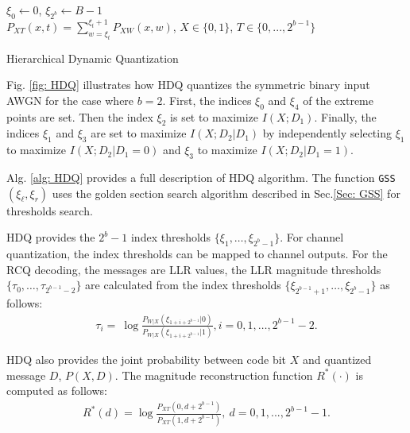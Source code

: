 \documentclass [PhD] {uclathes}
\begin{document}
\begin{algorithm}[t]
    \label{alg: HDQ}
    
    $\xi_0\leftarrow 0$, 
    $\xi_{2^b}\leftarrow B-1$\\
    $P_{XT}(x,t)=\sum_{w=\xi_t}^{\xi_t+1}P_{XW}(x,w)$, $X\in\{0,1\}$, $T\in\{0,...,2^{b-1}\}$
    \caption{Hierarchical Dynamic Quantization }
    \end{algorithm}
Fig. \ref{fig: HDQ} illustrates how HDQ quantizes the symmetric binary input AWGN for the case where $b=2$. First, the indices  $\xi_0$  and $\xi_4$ of the extreme points are set.  Then the index $\xi_2$ is set to maximize $I(X;D_1)$.  Finally, the indices $\xi_1$ and $\xi_3$ are set to maximize $I(X;D_2| D_1)$ by independently selecting $\xi_1$ to maximize $I(X;D_2| D_1=0)$ and $\xi_3$ to maximize $I(X;D_2| D_1=1)$.


Alg. \ref{alg: HDQ} provides a full description of HDQ algorithm. The function \texttt{GSS}$(\xi_{\ell},\xi_r)$ uses the golden section search algorithm described in Sec.\ref{Sec: GSS} for thresholds search.

HDQ provides the $2^b -1$ index thresholds $\{\xi_1, \ldots, \xi_{2^b-1} \}$. For channel quantization, the index thresholds can be mapped to channel outputs. For the RCQ decoding, the messages are LLR values, the LLR magnitude thresholds $\{\tau_0,\ldots,\tau_{2^{b-1}-2}\}$ are calculated from the index thresholds $\{\xi_{2^{b-1}+1}, \ldots ,\xi_{2^b-1} \}$ as follows:
\begin{align}
\tau_i =~ \log\frac{P_{W|X}(\xi_{1+i+2^{b-1}}|0)}{P_{W|X}(\xi_{1+i+2^{b-1}}|1)}, i=0,1,\ldots,2^{b-1}-2.
\end{align}

HDQ also provides the joint probability between code bit $X$ and quantized message $D$, $P(X,D)$. The magnitude reconstruction function  $R^*(\cdot)$ is computed as follows: 
\begin{align}
    R^*(d) = \log\frac{P_{XT}(0,d+2^{b-1})}{P_{XT}(1,d+2^{b-1})},~d=0,1,...,2^{b-1}-1.
    \label{equ: recon_hdq}
\end{align}
\end{document}
